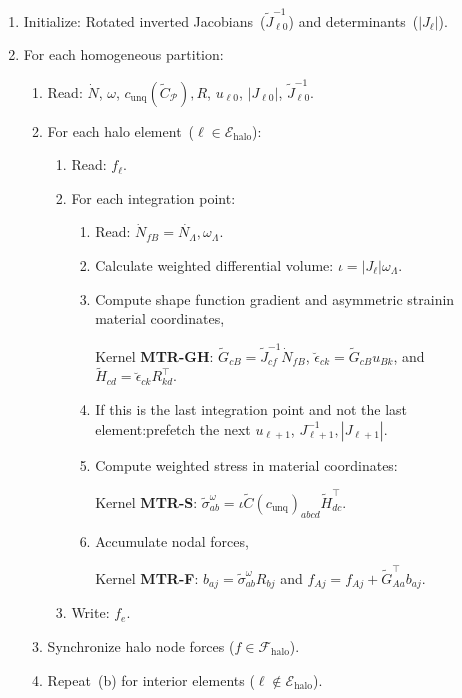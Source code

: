 \documentclass[]             %
{NASA}                       %
\begin{document}
\begin{algorithm}[ht]%
\caption{Material coordinates elastic response tensor kernels}
\label{alg:Anisotropic-linear-elastic}
\begin{enumerate}
\item Initialize:
Rotated inverted Jacobians~($\widetilde{J}_{{\ell}0}^{-1}$) and determinants~($|{J}_{\ell}|$).
\item For each homogeneous partition:
\begin{enumerate}
\item Read: $\dot{N}$, $\omega$, $c_\text{unq}(\widetilde{C}_{\mathcal{P}}), R$,
$u_{{\ell}0}$, $|J_{{\ell}0}|$, $\widetilde{J}_{{\ell}0}^{-1}$.
\item For each halo element~($\ell \in \mathcal{E}_{\mathrm{halo}}$):
\begin{enumerate}
\item Read: $f_{\ell}$.
\item For each integration point:
\begin{enumerate}
\item Read: $\dot{N}_{fB} = \dot{N_{\Lambda}}, \omega_{\Lambda}$.
\item Calculate weighted differential volume: $\iota = |J_{\ell}| \omega_{\Lambda}$.
\item Compute shape function gradient and asymmetric strain\break in material coordinates,

Kernel \textbf{MTR\nobreakdash-GH}: $\widetilde{G}_{cB} = \widetilde{J}_{cf}^{-1} \dot{N}_{fB}$, $\breve{\epsilon}_{ck} = \widetilde{G}_{cB} u_{Bk}$, and $\widetilde{H}_{cd} = \breve{\epsilon}_{ck} R_{kd}^{\top}$.
\item If this is the last integration point and not the last element:\break prefetch the next $u_{\ell+1}$, $J_{\ell+1}^{-1}, |J_{\ell+1}|$.
\item Compute weighted stress in material coordinates:

Kernel \textbf{MTR\nobreakdash-S}: $\widetilde{\sigma}_{ab}^{\omega} = \iota \widetilde{C}(c_\text{unq})_{abcd} \widetilde{H}^{\top}_{dc}$.
\item Accumulate nodal forces,

Kernel \textbf{MTR\nobreakdash-F}: $b_{aj} = \widetilde{\sigma}_{ab}^{\omega} R_{bj}$ and $f_{Aj} = f_{Aj} + \widetilde{G}_{Aa}^{\top} b_{aj}$.
\end{enumerate}
\item Write: $f_{e}$.
\end{enumerate}
\item Synchronize halo node forces ($f \in \mathcal{F}_{\mathrm{halo}}$).
\item Repeat~(b) for interior elements ($\ell \notin \mathcal{E}_{\mathrm{halo}}$).
\end{enumerate}
\end{enumerate}
\end{algorithm}
\end{document}
